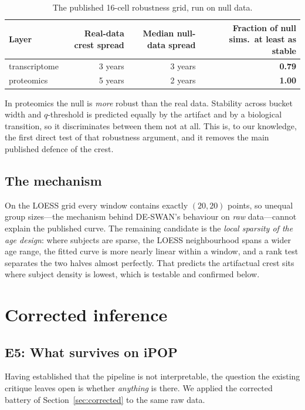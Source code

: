 \documentclass{article}
\begin{document}
\begin{table}[h]
\centering
\caption{The published 16-cell robustness grid, run on null data.}
\begin{tabular}{lrrr}
\toprule
Layer & Real-data crest spread & Median null-data spread & Fraction of null sims.\ at least as stable \\
\midrule
transcriptome & 3 years & 3 years & \textbf{0.79} \\
proteomics & 5 years & 2 years & \textbf{1.00} \\
\bottomrule
\end{tabular}
\end{table}

In proteomics the null is \emph{more} robust than the real data. Stability across bucket width and $q$-threshold is predicted equally by the artifact and by a biological transition, so it discriminates between them not at all. This is, to our knowledge, the first direct test of that robustness argument, and it removes the main published defence of the crest.

\subsection{The mechanism}

On the LOESS grid every window contains exactly $(20,20)$ points, so unequal group sizes---the mechanism behind DE-SWAN's behaviour on \emph{raw} data---cannot explain the published curve. The remaining candidate is the \emph{local sparsity of the age design}: where subjects are sparse, the LOESS neighbourhood spans a wider age range, the fitted curve is more nearly linear within a window, and a rank test separates the two halves almost perfectly. That predicts the artifactual crest sits where subject density is lowest, which is testable and confirmed below.

\section{Corrected inference}

\subsection{E5: What survives on iPOP}

Having established that the pipeline is not interpretable, the question the existing critique leaves open is whether \emph{anything} is there. We applied the corrected battery of Section~\ref{sec:corrected} to the same raw data.
\end{document}
